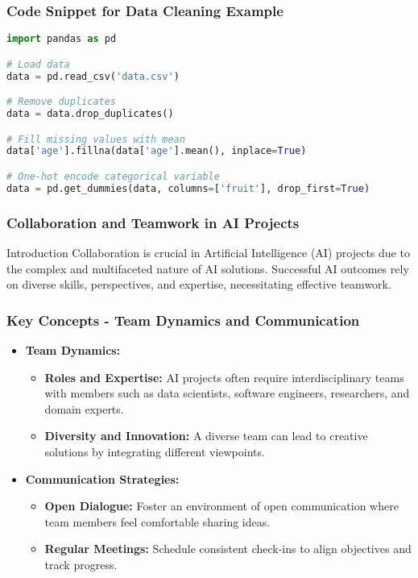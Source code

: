 \documentclass[aspectratio=169]{beamer}
\begin{document}
\begin{frame}[fragile]
    \frametitle{Code Snippet for Data Cleaning Example}
    \begin{lstlisting}[language=Python]
import pandas as pd

# Load data
data = pd.read_csv('data.csv')

# Remove duplicates
data = data.drop_duplicates()

# Fill missing values with mean
data['age'].fillna(data['age'].mean(), inplace=True)

# One-hot encode categorical variable
data = pd.get_dummies(data, columns=['fruit'], drop_first=True)
    \end{lstlisting}
\end{frame}

\begin{frame}[fragile]
    \frametitle{Collaboration and Teamwork in AI Projects}
    \begin{block}{Introduction}
        Collaboration is crucial in Artificial Intelligence (AI) projects due to the complex and multifaceted nature of AI solutions. 
        Successful AI outcomes rely on diverse skills, perspectives, and expertise, necessitating effective teamwork.
    \end{block}
\end{frame}

\begin{frame}[fragile]
    \frametitle{Key Concepts - Team Dynamics and Communication}
    \begin{itemize}
        \item \textbf{Team Dynamics:}
            \begin{itemize}
                \item \textbf{Roles and Expertise:} AI projects often require interdisciplinary teams with members such as data scientists, software engineers, researchers, and domain experts.
                \item \textbf{Diversity and Innovation:} A diverse team can lead to creative solutions by integrating different viewpoints.
            \end{itemize}
        
        \item \textbf{Communication Strategies:}
            \begin{itemize}
                \item \textbf{Open Dialogue:} Foster an environment of open communication where team members feel comfortable sharing ideas.
                \item \textbf{Regular Meetings:} Schedule consistent check-ins to align objectives and track progress.
            \end{itemize}
    \end{itemize}
\end{frame}
\end{document}
